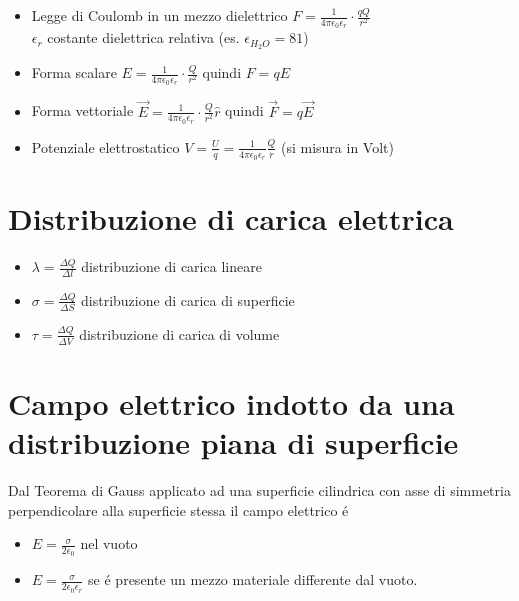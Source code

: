 \documentclass[17pt]{article}
\begin{document}
\begin{itemize}
	\item Legge di Coulomb in un mezzo dielettrico       $F = \frac{1}{4\pi\epsilon_0\epsilon_r}\cdot\frac{qQ}{r^2}$ \\ $\epsilon_r$ costante dielettrica relativa (es. $\epsilon_{H_2O} = 81$)
	\item Forma scalare $E = \frac{1}{4\pi\epsilon_0\epsilon_r}\cdot\frac{Q}{r^2}$ quindi $F = qE$
	\item Forma vettoriale $\vec{E} = \frac{1}{4\pi\epsilon_0\epsilon_r}\cdot\frac{Q}{r^2}\hat{r}$ quindi $\vec{F} = q\vec{E}$
	\item Potenziale elettrostatico $V = \frac{U}{q}=\frac{1}{4\pi\epsilon_0\epsilon_r}\frac{Q}{r}$ (si misura in Volt)
\end{itemize}









\section{Distribuzione di carica elettrica }

\begin{itemize}
	\item $\lambda = \frac{\Delta Q}{\Delta l}$ distribuzione di carica lineare
	\item $\sigma = \frac{\Delta Q}{\Delta S}$ distribuzione di carica di superficie
	\item $\tau = \frac{\Delta Q}{\Delta V}$ distribuzione di carica di volume
\end{itemize}

\section{Campo elettrico indotto da una distribuzione piana di superficie}

Dal Teorema di Gauss applicato ad una superficie cilindrica con asse di simmetria perpendicolare alla superficie stessa il campo elettrico \'e
\begin{itemize}
	\item $E = \frac{\sigma}{2\epsilon_0}$ nel vuoto
	\item $E = \frac{\sigma}{2\epsilon_0\epsilon_r}$ se \'e presente un mezzo materiale differente dal vuoto.
\end{itemize}
\end{document}
